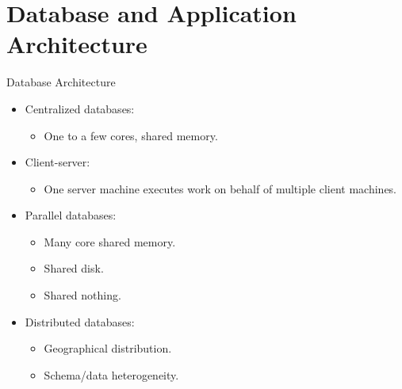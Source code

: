 \documentclass{beamer}
\begin{document}
\section{Database and Application Architecture}

\begin{frame}{Database Architecture}
    \begin{itemize}
        \item Centralized databases:
        \begin{itemize}
            \item One to a few cores, shared memory.
        \end{itemize}
        \item Client-server:
        \begin{itemize}
            \item One server machine executes work on behalf of multiple client machines.
        \end{itemize}
        \item Parallel databases:
        \begin{itemize}
            \item Many core shared memory.
            \item Shared disk.
            \item Shared nothing.
        \end{itemize}
        \item Distributed databases:
        \begin{itemize}
            \item Geographical distribution.
            \item Schema/data heterogeneity.
        \end{itemize}
    \end{itemize}
\end{frame}
\end{document}
